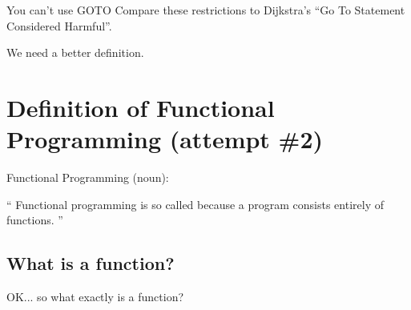 \documentclass{beamer}
\begin{document}
\begin{frame}{You can't use GOTO}
Compare these restrictions to Dijkstra's
``Go To Statement Considered Harmful''.
\end{frame}

\begin{frame}{}
We need a better definition.
\end{frame}

\section{Definition of Functional Programming (attempt \#2)}

\begin{frame}{Functional Programming (noun):}

\begin{exampleblock}{}
  {\large ``
  Functional programming is so called because a program consists entirely of functions.
  ''}
  \vskip5mm
  \hspace*{}
\end{exampleblock}
\end{frame}

\subsection{What is a function?}
\begin{frame}{}
OK... so what exactly is a function?
\end{frame}
\end{document}
